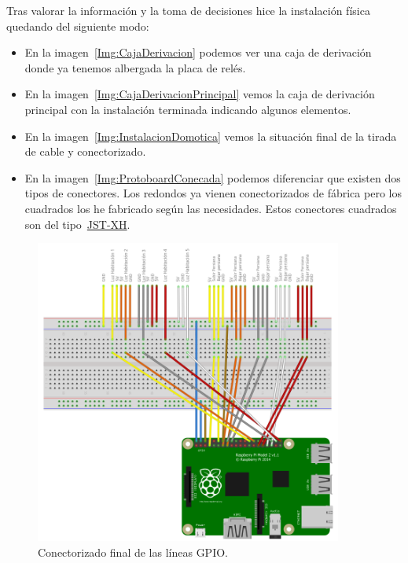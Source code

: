 Tras valorar la información y la toma de decisiones hice la instalación física quedando del siguiente modo:
\begin{itemize}
    \item En la imagen~\ref{Img:CajaDerivacion} podemos ver una caja de derivación donde ya tenemos albergada la placa de relés. 
    \item En la imagen~\ref{Img:CajaDerivacionPrincipal} vemos la caja de derivación principal con la instalación terminada indicando algunos elementos.
    \item En la imagen~\ref{Img:InstalacionDomotica} vemos la situación final de la tirada de cable y conectorizado.
    \item En la imagen~\ref{Img:ProtoboardConecada} podemos diferenciar que existen dos tipos de conectores. Los redondos ya vienen conectorizados de fábrica pero los cuadrados los he fabricado según las necesidades. Estos conectores cuadrados son del tipo~\href{https://ae01.alicdn.com/kf/H4205e9c4ec4c4be4864e44b6925a22bdf/10-juegos-de-conector-de-Cable-de-2-54mm-XH2-54-conector-XH-macho-y-hembra.jpg_Q90.jpg_.webp}{JST-XH}.
\end{itemize}

\begin{figure}
    \centering
    \includegraphics[width=0.9\textwidth]{img/RbP_CompletaLineas.png}
    \caption{Conectorizado final de las líneas GPIO.} \label{Img:RbP_CompletaLineas}
\end{figure}

